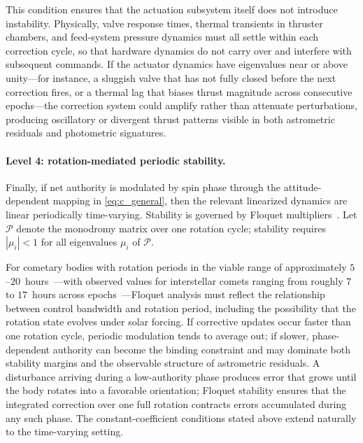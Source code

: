 \documentclass{article}
\begin{document}
This condition ensures that the actuation subsystem itself does not introduce instability. Physically, valve response times, thermal transients in thruster chambers, and feed-system pressure dynamics must all settle within each correction cycle, so that hardware dynamics do not carry over and interfere with subsequent commands. If the actuator dynamics have eigenvalues near or above unity---for instance, a sluggish valve that has not fully closed before the next correction fires, or a thermal lag that biases thrust magnitude across consecutive epochs---the correction system could amplify rather than attenuate perturbations, producing oscillatory or divergent thrust patterns visible in both astrometric residuals and photometric signatures.


\paragraph{Level 4: rotation-mediated periodic stability.}
Finally, if net authority is modulated by spin phase through the attitude-dependent mapping in \eqref{eq:c_general}, then the relevant linearized dynamics are linear periodically time-varying. Stability is governed by Floquet multipliers~\cite{bittanti2009periodic}. Let $\mathcal{P}$ denote the monodromy matrix over one rotation cycle; stability requires $|\mu_i|<1$ for all eigenvalues $\mu_i$ of $\mathcal{P}$.

For cometary bodies with rotation periods in the viable range of approximately $5$--$20$~hours~\cite{Kokotanekova2017Rotation}---with observed values for interstellar comets ranging from roughly $7$ to $17$~hours across epochs~\cite{scarmato2026rotation,delaFuenteMarcos2025gtc}---Floquet analysis must reflect the relationship between control bandwidth and rotation period, including the possibility that the rotation state evolves under solar forcing. If corrective updates occur faster than one rotation cycle, periodic modulation tends to average out; if slower, phase-dependent authority can become the binding constraint and may dominate both stability margins and the observable structure of astrometric residuals. A disturbance arriving during a low-authority phase produces error that grows until the body rotates into a favorable orientation; Floquet stability ensures that the integrated correction over one full rotation contracts errors accumulated during any such phase. The constant-coefficient conditions stated above extend naturally to the time-varying setting.
\end{document}
